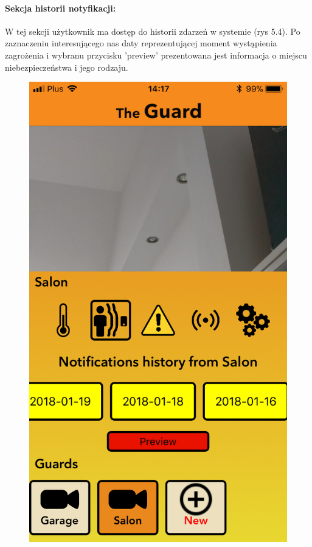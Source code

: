 \paragraph{Sekcja historii notyfikacji:}
W tej sekcji użytkownik ma dostęp do historii zdarzeń w systemie (rys 5.4). Po zaznaczeniu interesującego nas daty reprezentującej moment wystąpienia zagrożenia i wybranu przycisku 'preview' prezentowana jest informacja o miejscu niebezpieczeństwa i jego rodzaju.
\begin{figure}[h]
\centering
\begin{minipage}{.4\linewidth}
    \includegraphics[width=\linewidth]{history.png}

\end{minipage}
\end{figure}
